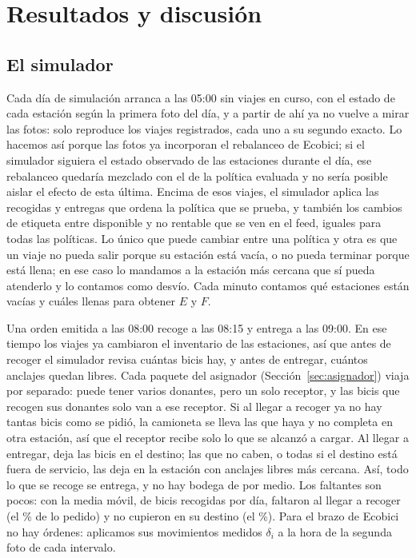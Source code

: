 \documentclass[conference,letterpaper,10pt]{IEEEtran}
\begin{document}
\section{Resultados y discusión}\label{sec:resultados}
\subsection{El simulador}
Cada día de simulación arranca a las 05:00 sin viajes en curso, con el estado de cada estación según la primera foto del día, y a partir de ahí ya no vuelve a mirar las fotos: solo reproduce los viajes registrados, cada uno a su segundo exacto. Lo hacemos así porque las fotos ya incorporan el rebalanceo de Ecobici; si el simulador siguiera el estado observado de las estaciones durante el día, ese rebalanceo quedaría mezclado con el de la política evaluada y no sería posible aislar el efecto de esta última. Encima de esos viajes, el simulador aplica las recogidas y entregas que ordena la política que se prueba, y también los cambios de etiqueta entre disponible y no rentable que se ven en el feed, iguales para todas las políticas. Lo único que puede cambiar entre una política y otra es que un viaje no pueda salir porque su estación está vacía, o no pueda terminar porque está llena; en ese caso lo mandamos a la estación más cercana que sí pueda atenderlo y lo contamos como desvío. Cada minuto contamos qué estaciones están vacías y cuáles llenas para obtener $E$ y $F$.

Una orden emitida a las 08:00 recoge a las 08:15 y entrega a las 09:00. En ese tiempo los viajes ya cambiaron el inventario de las estaciones, así que antes de recoger el simulador revisa cuántas bicis hay, y antes de entregar, cuántos anclajes quedan libres. Cada paquete del asignador (Sección~\ref{sec:asignador}) viaja por separado: puede tener varios donantes, pero un solo receptor, y las bicis que recogen sus donantes solo van a ese receptor. Si al llegar a recoger ya no hay tantas bicis como se pidió, la camioneta se lleva las que haya y no completa en otra estación, así que el receptor recibe solo lo que se alcanzó a cargar. Al llegar a entregar, deja las bicis en el destino; las que no caben, o todas si el destino está fuera de servicio, las deja en la estación con anclajes libres más cercana. Así, todo lo que se recoge se entrega, y no hay bodega de por medio. Los faltantes son pocos: con la media móvil, de \coRecogidas{} bicis recogidas por día, faltaron \coFalta{} al llegar a recoger (el \coFaltaPct\% de lo pedido) y \coDevueltas{} no cupieron en su destino (el \coDevueltasPct\%). Para el brazo de Ecobici no hay órdenes: aplicamos sus movimientos medidos $\delta_i$ a la hora de la segunda foto de cada intervalo.
\end{document}

